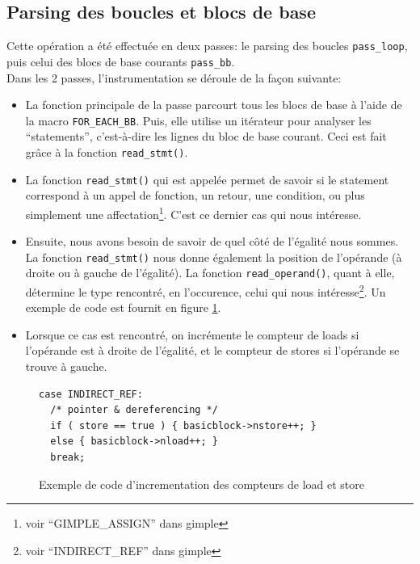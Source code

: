 \subsection{Parsing des boucles et blocs de base}

Cette opération a été effectuée en deux passes: le parsing des boucles \verb#pass_loop#, puis celui des blocs de base courants \verb#pass_bb#.\\

Dans les 2 passes, l'instrumentation se déroule de la façon suivante:\\

\begin{itemize}

\item La fonction principale de la passe parcourt tous les blocs de base à l'aide de la macro \verb#FOR_EACH_BB#. Puis, elle utilise un itérateur pour analyser les ``statements'', c'est-à-dire les lignes du bloc de base courant. Ceci est fait grâce à la fonction \verb#read_stmt()#.\\

\item La fonction \verb#read_stmt()# qui est appelée permet de savoir si le statement correspond à un appel de fonction, un retour, une condition, ou plus simplement une affectation\footnote{voir ``GIMPLE\_ASSIGN'' dans gimple}. C'est ce dernier cas qui nous intéresse.\\

\item Ensuite, nous avons besoin de savoir de quel côté de l'égalité nous sommes. La fonction \verb#read_stmt()# nous donne également la position de l'opérande (à droite ou à gauche de l'égalité). La fonction \verb#read_operand()#, quant à elle, détermine le type rencontré, en l'occurence, celui qui nous intéresse\footnote{voir ``INDIRECT\_REF'' dans gimple}. Un exemple de code est fournit en figure \ref{fig:count_example}.\\

\item Lorsque ce cas est rencontré, on incrémente le compteur de loads si l'opérande est à droite de l'égalité, et le compteur de stores si l'opérande se trouve à gauche.\\

\end{itemize}

\begin{figure}[here]
  \centering
\begin{verbatim}
case INDIRECT_REF:
  /* pointer & dereferencing */
  if ( store == true ) { basicblock->nstore++; }
  else { basicblock->nload++; }
  break;
\end{verbatim}
  \caption{Exemple de code d'incrementation des compteurs de load et store}
  \label{fig:count_example}
\end{figure}

